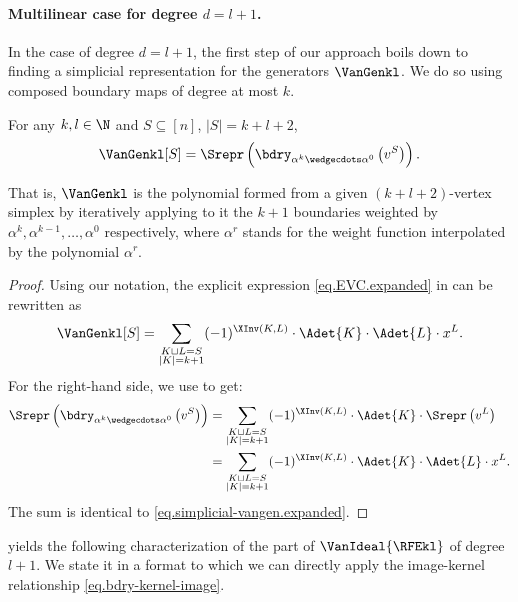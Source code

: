 \documentclass{toc}
\begin{document}
\paragraph{Multilinear case for degree $d=l+1$.}
In the case of degree $d=l+1$, the first step of our approach boils down to finding a simplicial representation for the generators $\VanGenkl$. We do so using composed boundary maps of degree at most $k$.
\begin{lemma}
  \label{lem.simplicial-vangen}
  For any \(k,l \in \N\) and \(S\subseteq [n]\), $|S|=k+l+2$,
  \begin{equation} \label{eq.simplicial-vangen}
    \VanGenkl[S]
    =
    \Srepr \left( 
      \bdry_{\alpha^k\wedgecdots\alpha^0}\left(
        v^S
      \right)
     \right).
  \end{equation}
\end{lemma}
\noindent
That is, \(\VanGenkl\) is the polynomial formed from a given
\((k+l+2)\)-vertex simplex by iteratively applying to it the \(k+1\) boundaries weighted by \(\alpha^k, \alpha^{k-1}, \ldots, \alpha^0\) respectively, where \(\alpha^r\) stands for the weight function interpolated by the polynomial \(\alpha^r\).
\begin{proof}
Using our notation, the explicit expression \eqref{eq.EVC.expanded} in  can be rewritten as
  \begin{equation}
    \label{eq.simplicial-vangen.expanded}
      \VanGenkl[S] = \sum_{\substack{K\sqcup L= S \\ |K|=k+1}}
    (-1)^{\XInv(K,L)}\cdot \Adet{K}\cdot \Adet{L}\cdot x^L.
  \end{equation}
  For the right-hand side, we use  to get:
  \begin{align*}
      \Srepr \left(
      \bdry_{\alpha^k\wedgecdots\alpha^0}\left(
        v^S
      \right)
    \right) 
    &= 
    \sum_{\substack{K\sqcup L= S \\ |K|=k+1}} 
    (-1)^{\XInv(K,L)} \cdot
    \Adet{K}\cdot
    \Srepr \left( v^L \right) \\
    &= 
    \sum_{\substack{K\sqcup L= S \\ |K|=k+1}} 
    (-1)^{\XInv(K,L)} \cdot
    \Adet{K}\cdot
    \Adet{L}\cdot
    x^L.
  \end{align*}
  The sum is identical to \eqref{eq.simplicial-vangen.expanded}.
\end{proof}

 yields the following characterization of the part of $\VanIdeal{\RFEkl}$ of degree $l+1$. We state it in a format to which we can directly apply the image-kernel relationship \eqref{eq.bdry-kernel-image}.
\end{document}
